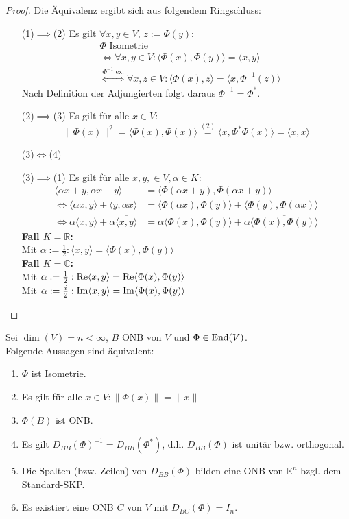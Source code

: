 \documentclass[parskip,a4paper,twoside,DIV15,BCOR12mm]{scrbook}
\begin{document}
\begin{proof}
Die Äquivalenz ergibt sich aus folgendem Ringschluss:
\begin{enumerate}
\item[(1)$\implies$(2)] Es gilt $\forall x,y\in V$, $z:=\Phi(y)$:
\begin{align*}
&\Phi \text{ Isometrie}\\
&\iff \forall x,y\in V:\langle\Phi(x),\Phi(y)\rangle =\langle x,y\rangle\\
&\stackrel{\Phi^{-1}\text{ ex.}}{\iff} \forall x,z\in V:\langle\Phi(x),z\rangle
=\langle x,\Phi^{-1}(z)\rangle
\end{align*}
Nach Definition der Adjungierten folgt daraus $\Phi^{-1} = \Phi^*$.
\item[(2)$\implies$(3)] Es gilt für alle $x\in V$:
\[\|\Phi(x)\|^2=\langle\Phi(x),\Phi(x)\rangle\stackrel{(2)}{=}
\langle x,\Phi^*\Phi(x)\rangle=\langle x,x\rangle\]
\item[(3)$\iff$(4)] \checkmark
\item[(3)$\implies$(1)] Es gilt für alle $x,y,\in V,\alpha\in K:$
\begin{align*}
\langle\alpha x+y,\alpha x+y\rangle &= \langle\Phi(\alpha x+y),\Phi(\alpha x+y)\rangle\\
\iff\langle \alpha x,y\rangle +\langle y,\alpha x\rangle &= \langle\Phi(\alpha x),
\Phi(y)\rangle + \langle\Phi(y),\Phi(\alpha x)\rangle\\
\iff\alpha\langle x,y\rangle +\overline{\alpha}\overline{\langle x,y\rangle} &=
\alpha\langle\Phi(x),\Phi(y)\rangle + \overline{\alpha}\overline{\langle\Phi(x),\Phi(y)\rangle}
\end{align*}
\textbf{Fall $K=\mathbb{R}$:}\\ 
Mit $\alpha:=\frac12:\langle x,y\rangle =\langle\Phi(x),\Phi(y)\rangle$\\
\textbf{Fall $K=\mathbb{C}$:}\\ 
Mit $\alpha:=\frac12:\operatorname{Re}\langle x,y\rangle =\operatorname{Re}\langle\Phi(x),\Phi(y)\rangle$\\
Mit $\alpha:=\frac i2:\operatorname{Im}\langle x,y\rangle =\operatorname{Im}\langle\Phi(x),\Phi(y)\rangle$
\end{enumerate}
\end{proof}

\begin{corollary}
Sei $\dim(V)=n<\infty$, $B$ ONB von $V$ und $\Phi\in\operatorname{End}(V)$.\\
Folgende Aussagen sind äquivalent:
\begin{enumerate}
\item $\Phi$ ist Isometrie.
\item Es gilt für alle $x\in V:\|\Phi(x)\|=\|x\|$
\item $\Phi(B)$ ist ONB.
\item Es gilt $D_{BB}(\Phi)^{-1} = D_{BB}(\Phi^*)$, d.h. $D_{BB}(\Phi)$ ist unitär bzw. orthogonal.
\item Die Spalten (bzw. Zeilen) von $D_{BB}(\Phi)$ bilden eine ONB von $\mathbb{K}^n$ bzgl.
dem Standard-SKP.
\item Es existiert eine ONB $C$ von $V$ mit $D_{BC}(\Phi)=I_n$.
\end{enumerate}
\end{corollary}
\end{document}
